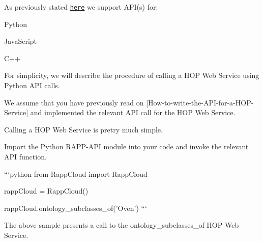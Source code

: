 As previously stated \href{https://github.com/rapp-project/rapp-platform/wiki/How-to-write-the-API-for-a-HOP-service%3F}{\tt here} we support A\-P\-I(s) for\-:


\begin{DoxyItemize}
\item Python
\item Java\-Script
\item C++
\end{DoxyItemize}

For simplicity, we will describe the procedure of calling a H\-O\-P Web Service using Python A\-P\-I calls.

We assume that you have previously read on \mbox{[}How-\/to-\/write-\/the-\/\-A\-P\-I-\/for-\/a-\/\-H\-O\-P-\/\-Service\mbox{]} and implemented the relevant A\-P\-I call for the H\-O\-P Web Service.

Calling a H\-O\-P Web Service is pretry much simple.

Import the Python R\-A\-P\-P-\/\-A\-P\-I module into your code and invoke the relevant A\-P\-I function.

```python from Rapp\-Cloud import Rapp\-Cloud

rapp\-Cloud = Rapp\-Cloud()

rapp\-Cloud.\-ontology\-\_\-subclasses\-\_\-of('Oven') ```

The above sample presents a call to the ontology\-\_\-subclasses\-\_\-of H\-O\-P Web Service. 